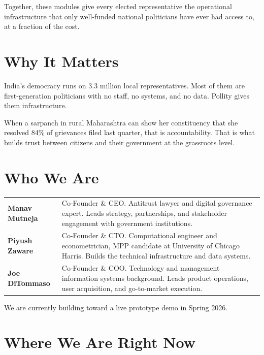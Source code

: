 \documentclass[11pt, a4paper]{article}
\begin{document}
\vspace{0.5em}
Together, these modules give every elected representative the operational infrastructure that only well-funded national politicians have ever had access to, at a fraction of the cost.

\section{Why It Matters}

India's democracy runs on 3.3 million local representatives. Most of them are first-generation politicians with no staff, no systems, and no data. Pollity gives them infrastructure.

When a sarpanch in rural Maharashtra can show her constituency that she resolved 84\% of grievances filed last quarter, that is accountability. That is what builds trust between citizens and their government at the grassroots level.

\section{Who We Are}

\begin{tabularx}{\linewidth}{lX}
\toprule
\textbf{Manav Mutneja} & Co-Founder \& CEO. Antitrust lawyer and digital governance expert. Leads strategy, partnerships, and stakeholder engagement with government institutions. \\[4pt]
\textbf{Piyush Zaware} & Co-Founder \& CTO. Computational engineer and econometrician, MPP candidate at University of Chicago Harris. Builds the technical infrastructure and data systems. \\[4pt]
\textbf{Joe DiTommaso} & Co-Founder \& COO. Technology and management information systems background. Leads product operations, user acquisition, and go-to-market execution. \\
\bottomrule
\end{tabularx}

\vspace{0.5em}
We are currently building toward a live prototype demo in Spring 2026.

\section{Where We Are Right Now}
\end{document}
